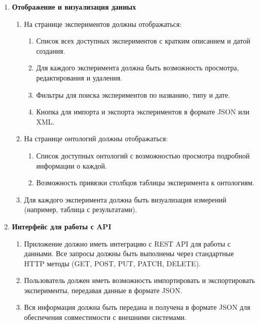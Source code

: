 \documentclass[a4paper,12pt,reqno]{article}
\begin{document}
\begin{enumerate}
        \item \textbf{Отображение и визуализация данных}
        \begin{enumerate}[label=\arabic{enumi}.\arabic*.]
            \item На странице экспериментов должны отображаться:
            \begin{enumerate}[label=\arabic{enumi}.\arabic{enumii}.\arabic*.]
                \item Список всех доступных экспериментов с кратким описанием и датой создания.
                \item Для каждого эксперимента должна быть возможность просмотра, редактирования и удаления.
                \item Фильтры для поиска экспериментов по названию, типу и дате.
                \item Кнопка для импорта и экспорта экспериментов в формате JSON или XML.
            \end{enumerate}
            \item На странице онтологий должны отображаться:
            \begin{enumerate}[label=\arabic{enumi}.\arabic{enumii}.\arabic*.]
                \item Список доступных онтологий с возможностью просмотра подробной информации о каждой.
                \item Возможность привязки столбцов таблицы эксперимента к онтологиям.
            \end{enumerate}
            \item Для каждого эксперимента должна быть визуализация измерений (например, таблица с результатами).
        \end{enumerate}

        \item \textbf{Интерфейс для работы с API}
        \begin{enumerate}[label=\arabic{enumi}.\arabic*.]
            \item Приложение должно иметь интеграцию с REST API для работы с данными. Все запросы должны быть выполнены через стандартные HTTP методы (GET, POST, PUT, PATCH, DELETE).
            \item Пользователь должен иметь возможность импортировать и экспортировать эксперименты, передавая данные в формате JSON.
            \item Вся информация должна быть передана и получена в формате JSON для обеспечения совместимости с внешними системами.
        \end{enumerate}


\end{enumerate}
\end{document}
